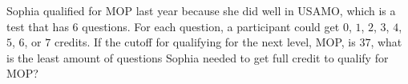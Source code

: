 Sophia qualified for MOP last year because she did well in USAMO, which is a test that has 6 questions. For each question, a participant could get $0$, $1$, $2$, $3$, $4$, $5$, $6$, or $7$ credits. If the cutoff for qualifying for the next level, MOP, is $37$, what is the least amount of questions Sophia needed to get full credit to qualify for MOP?
